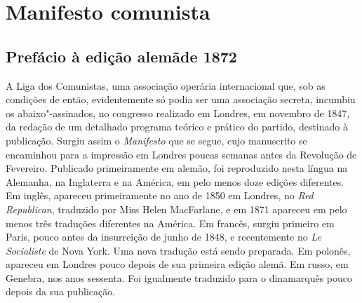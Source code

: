 \pagestyle{baruch}

\part{Manifesto comunista}

\chapter[Prefácio à edição alemã de 1872]{Prefácio à edição alemã\break de 1872}

A Liga dos Comunistas, uma associação operária internacional que, sob as
condições de então, evidentemente só podia ser uma associação secreta,
incumbiu os abaixo"-assinados, no congresso realizado em Londres, em
novembro de 1847, da redação de um detalhado programa teórico e prático
do partido, destinado à publicação. Surgiu assim o \textit{Manifesto}
que se segue, cujo manuscrito se encaminhou para a impressão em Londres
poucas semanas antes da Revolução de Fevereiro. Publicado primeiramente
em alemão, foi reproduzido nesta língua na Alemanha, na Inglaterra e na
América, em pelo menos doze edições diferentes. Em inglês, apareceu
primeiramente no ano de 1850 em Londres, no \textit{Red Republican},
traduzido por Miss Helen MacFarlane, e em 1871 apareceu em pelo menos
três traduções diferentes na América. Em francês, surgiu primeiro em
Paris, pouco antes da insurreição de junho de 1848, e recentemente no
\textit{Le Socialiste} de Nova York. Uma nova tradução está sendo
preparada. Em polonês, apareceu em Londres pouco depois de sua primeira
edição alemã. Em russo, em Genebra, nos anos sessenta. Foi igualmente
traduzido para o dinamarquês pouco depois da sua publicação.

